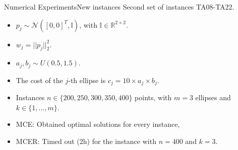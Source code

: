 \documentclass{beamer}
\newcommand{\R}{\mathbb{R}}
\theoremstyle{definition}
\begin{document}
\begin{frame}{Numerical Experiments}{New instances}
	Second set of instances TA08-TA22.
	\begin{itemize}
		\item $p_j \sim \mathcal{N}([0, 0]^T, \mathbb{I})$, with $\mathbb{I} \in \R^{2\times 2}$.
		\item $w_j = ||p_j||_2^2$.
		\item $a_j, b_j \sim U(0.5, 1.5)$.
		\item The cost of the $j$-th ellipse is $c_j = 10 \times a_j \times b_j$.
		\item Instances  $n\in\{200, 250, 300, 350, 400\}$ points, with $m=3$ ellipses and $k \in \{1,\dots, m\}$.
		\item MCE: Obtained optimal solutions for every instance,
		\item MCER: Timed out (2h) for the instance with $n=400$ and $k=3$.
	\end{itemize}
\end{frame}
\end{document}
